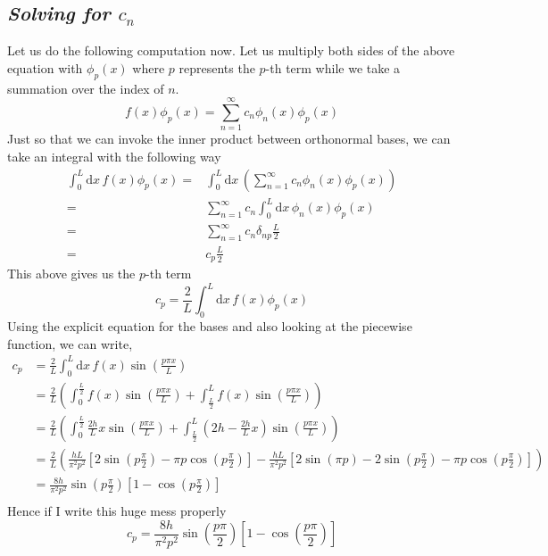 \documentclass[letter]{article}
\begin{document}
\subsection*{\emph{Solving for $c_n$} }
Let us do the following computation now. Let us multiply both sides of the above equation with $\phi_p(x)$ where $p$ represents the  $p$-th term while we take a summation over the index of $n$.
\[
f(x) \phi_p (x) = \sum_{n=1}^{\infty} c_n \phi_n(x) \phi_p(x)
\]
Just so that we can invoke the inner product between orthonormal bases, we can take an integral with the following way
\begin{align*}
	\int_{0}^{L} \mathrm{d} x \,  f(x) \phi_p(x) =& \int_{0}^{L} \mathrm{d} x\,  \left(
 \sum_{n=1}^{\infty} c_n \phi_n(x) \phi_p(x) \right) \\ 
		=& \sum_{n=1}^{\infty} c_n \int_{0}^{L} \mathrm{d} x \, \phi_n(x) \phi_p(x)  \\
		=& \sum_{n=1}^{\infty} c_n \delta_{np} \frac{L}{2} \\
		=& c_p \frac{L}{2}
\end{align*}
This above gives us the $p$-th term
\[
c_p = \frac{2}{L} \int_{0}^{L} \mathrm{d} x \, f(x) \phi_p(x)  
\] 
Using the explicit equation for the bases and also looking at the piecewise function, we can write, 
\begin{align*}
	c_p &= \frac{2}{L} \int_{0}^{L} \mathrm{d} x \, f(x) \sin \left( \frac{p \pi x }{L}\right)  \\
	&= \frac{2}{L} 
	\left( \int_{0}^{\frac{L}{2}}  f(x) \sin\left(\frac{p \pi x}{L}\right) + 
	\int_{\frac{L}{2}}^{L} f(x) \sin \left(\frac{p \pi x}{L}\right)  \right)\\
	&= \frac{2}{L} 
	\left(
	\int_{0}^{\frac{L}{2} } \frac{2h}{L} x \sin\left(\frac{p \pi x}{L}\right) +
	\int_{\frac{L}{2}}^{L} \left(2 h - \frac{2h}{L} x \right) \sin \left(\frac{p \pi x}{L}\right) 
	\right)\\
	&= 
	\frac{2}{L} 
	\left(
\frac{hL}{\pi ^2 p^2 } \left[ 
2 \sin \left(p \frac{\pi}{2} \right) - \pi p \cos \left(p \frac{\pi}{2}\right)
\right]  - \frac{hL}{\pi ^2 p ^2} 
\left[
	2 \sin\left(\pi p \right) - 2 \sin \left(p \frac{\pi}{2}\right) - \pi p \cos \left(p \frac{\pi}{ 2}\right)
\right]
	\right)\\ 
	&= \frac{8h}{\pi ^2 p^2} \sin \left(p \frac{\pi}{2}\right) \left[1 - \cos \left(p \frac{\pi}{2}\right)\right] \\
\end{align*}
Hence if I write this huge mess properly
\[
\boxed{
	c_p = \frac{8h}{\pi ^2 p ^2} \sin\left(\frac{p \pi }{2}\right) \left[ 1 - \cos \left(\frac{p \pi }{2}\right) \right]
}
\] 
\end{document}
